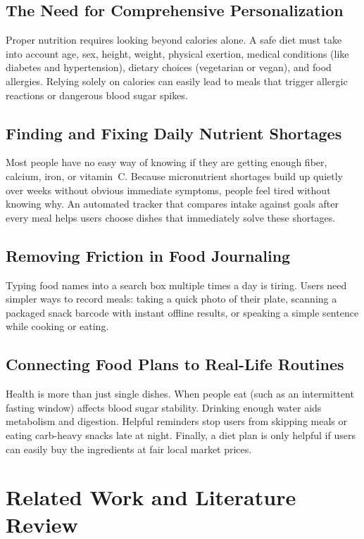 \documentclass[10pt, conference, letterpaper]{IEEEtran}
\begin{document}
\subsection{The Need for Comprehensive Personalization}
Proper nutrition requires looking beyond calories alone. A safe diet must take into account age, sex, height, weight, physical exertion, medical conditions (like diabetes and hypertension), dietary choices (vegetarian or vegan), and food allergies. Relying solely on calories can easily lead to meals that trigger allergic reactions or dangerous blood sugar spikes.

\subsection{Finding and Fixing Daily Nutrient Shortages}
Most people have no easy way of knowing if they are getting enough fiber, calcium, iron, or vitamin~C. Because micronutrient shortages build up quietly over weeks without obvious immediate symptoms, people feel tired without knowing why. An automated tracker that compares intake against goals after every meal helps users choose dishes that immediately solve these shortages.

\subsection{Removing Friction in Food Journaling}
Typing food names into a search box multiple times a day is tiring. Users need simpler ways to record meals: taking a quick photo of their plate, scanning a packaged snack barcode with instant offline results, or speaking a simple sentence while cooking or eating.

\subsection{Connecting Food Plans to Real-Life Routines}
Health is more than just single dishes. When people eat (such as an intermittent fasting window) affects blood sugar stability. Drinking enough water aids metabolism and digestion. Helpful reminders stop users from skipping meals or eating carb-heavy snacks late at night. Finally, a diet plan is only helpful if users can easily buy the ingredients at fair local market prices.

\section{Related Work and Literature Review}
\end{document}
